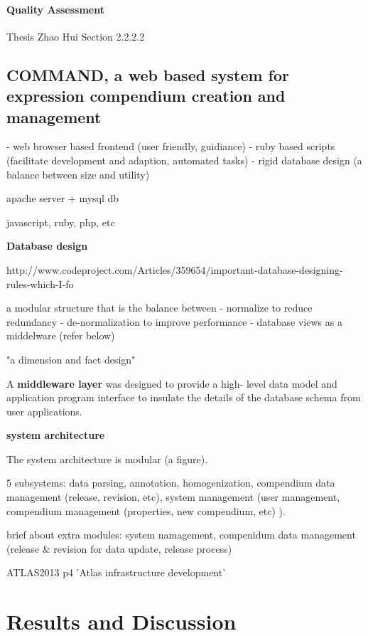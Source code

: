 \paragraph{Quality Assessment}

Thesis Zhao Hui Section 2.2.2.2




\subsection{COMMAND, a web based system for expression compendium creation and management}


- web browser based frontend (user friendly, guidiance) 
- ruby based scripts (facilitate development and adaption, automated tasks) 
- rigid database design (a balance between size and utility) 

apache server + mysql db

javascript, ruby, php, etc 


\textbf{Database design}

http://www.codeproject.com/Articles/359654/important-database-designing-rules-which-I-fo

a modular structure that is the balance between 
- normalize to reduce redundancy
- de-normalization to improve performance
- database views as a middelware (refer below)

"a dimension and fact design"

A \textbf{middleware layer} was designed to provide a high-
level data model and application program interface to
insulate the details of the database schema from user
applications. 


\textbf{system architecture}

The system architecture is modular (a figure). 

5 subsystems: data parsing, annotation, homogenization, compendium data 
management (release, revision, etc), system management (user management, 
compendium management (properties, new compendium, etc) ). 

brief about extra modules: system namagement, compenidum data management 
(release \& revision for data update,  release process)


\cite{Petryszak2013} ATLAS2013 p4  'Atlas infrastructure development'




\section{Results and Discussion}

